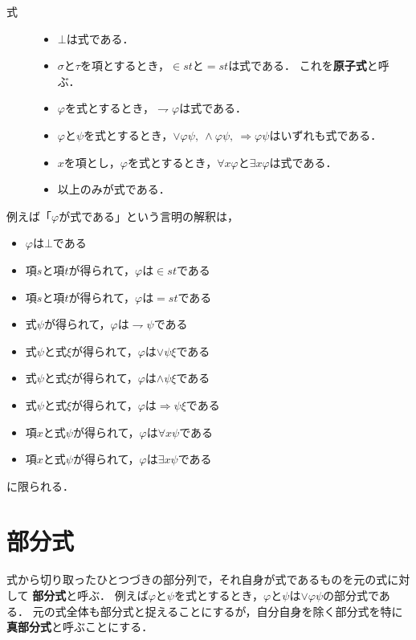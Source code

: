 \documentclass[a4j,10.5pt,oneside,openany]{jsbook}
\theoremstyle{mystyle}
\begin{document}
	\begin{description}
		\item[式]
			\begin{itemize}
				\item $\bot$は式である．
				\item $\sigma$と$\tau$を項とするとき，$\in st$と$=st$は式である．
					これを{\bf 原子式}と呼ぶ．
				\item $\varphi$を式とするとき，$\rightharpoondown \varphi$は式である．
				\item $\varphi$と$\psi$を式とするとき，$\vee \varphi \psi,\ 
					\wedge \varphi \psi,\ \Longrightarrow \varphi \psi$はいずれも式である．
			
				\item $x$を項とし，$\varphi$を式とするとき，$\forall x \varphi$と$\exists x \varphi$は式である．
				
				\item 以上のみが式である．
			\end{itemize}
	\end{description}
	
	例えば「$\varphi$が式である」という言明の解釈は，
	\begin{itemize}
		\item $\varphi$は$\bot$である
		\item 項$s$と項$t$が得られて，$\varphi$は$\in s t$である
		\item 項$s$と項$t$が得られて，$\varphi$は$= s t$である
		\item 式$\psi$が得られて，$\varphi$は$\rightharpoondown \psi$である
		\item 式$\psi$と式$\xi$が得られて，$\varphi$は$\vee \psi \xi$である
		\item 式$\psi$と式$\xi$が得られて，$\varphi$は$\wedge \psi \xi$である
		\item 式$\psi$と式$\xi$が得られて，$\varphi$は$\Longrightarrow \psi \xi$である
		\item 項$x$と式$\psi$が得られて，$\varphi$は$\forall x \psi$である
		\item 項$x$と式$\psi$が得られて，$\varphi$は$\exists x \psi$である
	\end{itemize}
	に限られる．
	
\section{部分式}
	式から切り取ったひとつづきの部分列で，それ自身が式であるものを元の式に対して
	{\bf 部分式}と呼ぶ．
	例えば$\varphi$と$\psi$を式とするとき，$\varphi$と$\psi$は$\vee \varphi \psi$の部分式である．
	元の式全体も部分式と捉えることにするが，自分自身を除く部分式を特に
	{\bf 真部分式}と呼ぶことにする．
	
\end{document}
